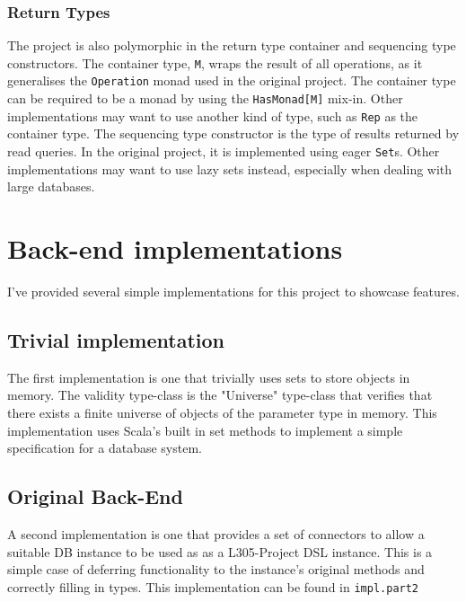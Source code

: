 \documentclass{report}
\newcommand \2[0]{\textbf{2}}
\newcommand \3[0]{\textbf{3}}
\begin{document}
\subsection{Return Types}
The project is also polymorphic in the return type container and sequencing type constructors. The container type, \texttt{M}, wraps the result of all operations, as it generalises the \texttt{Operation} monad used in the original project. The container type can be required to be a monad by using the \texttt{HasMonad[M]} mix-in. Other implementations may want to use another kind of type, such as \texttt{Rep} as the container type. The sequencing type constructor is the type of results returned by read queries. In the original project, it is implemented using eager \texttt{Set}s. Other implementations may want to use lazy sets instead, especially when dealing with large databases.

\chapter{Back-end implementations}

I've provided several simple implementations for this project to showcase features.
\section{Trivial implementation}
The first implementation is one that trivially uses sets  to store objects in memory. The validity type-class is the "Universe" type-class that verifies that there exists a finite universe of objects of the parameter type in memory. This implementation uses Scala's built in set methods to implement a simple specification for a database system.

\section{Original Back-End}
A second implementation is one that provides a set of connectors to allow a suitable DB instance to be used as as a L305-Project DSL instance. This is a simple case of deferring functionality to the instance's original methods and correctly filling in types.
This implementation can be found in \texttt{impl.part2} 
\end{document}
